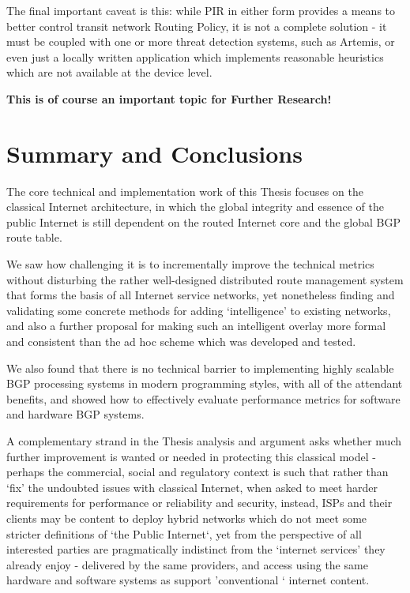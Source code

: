 The final important caveat is this: while PIR in either form provides a means to better control transit network Routing Policy, it is not a complete solution - it must be coupled with one or more threat detection systems, such as Artemis\cite{Sermpezis2018}, or even just a locally written application which implements reasonable heuristics which are not available at the device level.

\textbf{This is of course an important topic for Further Research!}


\section{Summary and Conclusions}

The core technical and implementation work of this Thesis focuses on the classical Internet architecture, in which the global integrity and essence of the public Internet is still dependent on the routed Internet core and the global BGP route table. 

We saw how challenging it is to incrementally improve the technical metrics without disturbing the rather well-designed distributed route management system that forms the basis of all Internet service networks, yet nonetheless finding and validating some concrete methods for adding `intelligence' to existing networks, and also a further proposal for making such an intelligent overlay more formal and consistent than the ad hoc scheme which was developed and tested.

We also found that there is no technical barrier to implementing highly scalable BGP processing systems in modern programming styles, with all of the attendant benefits, and showed how to effectively evaluate performance metrics for software and hardware BGP systems.

\bigskip

A complementary strand in the Thesis analysis and argument asks whether much further improvement is wanted or needed in protecting this classical model - perhaps the commercial, social and regulatory context is such that rather than `fix' the undoubted issues with classical Internet, when asked to meet harder requirements for performance or reliability and security, instead, ISPs and their clients may be content to deploy hybrid networks which do not meet some stricter definitions of `the Public Internet`, yet from the perspective of all interested parties are pragmatically indistinct from the `internet services' they already enjoy - delivered by the same providers, and access using the same hardware and software systems as support 'conventional ` internet content.

